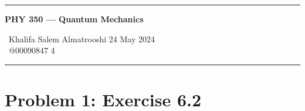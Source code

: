 \documentclass{article}
\numberwithin{equation}{section}
\begin{document}
	
	\begin{center}
		\hrule
		\vspace{0.4cm}
		\textbf { \Large PHY 350 --- Quantum Mechanics}
		\vspace{0.4cm}
	\end{center}
		 \ Khalifa Salem Almatrooshi \hspace{\fill}  24 May 2024 \\
		 \ @00090847 \hspace{\fill}  4 \\
		\hrule	
	
	\section{Problem 1: Exercise 6.2}
	
\end{document}
